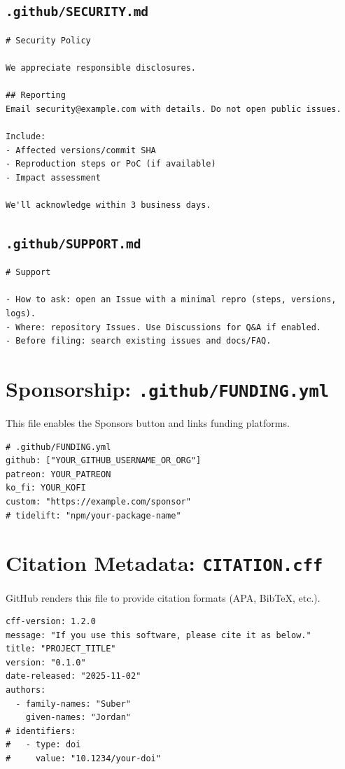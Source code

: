 \documentclass[11pt]{article}
\newcommand{\file}[1]{\texttt{#1}}
\begin{document}
\clearpage
\subsection{\file{.github/SECURITY.md}}
\begin{verbatim}
# Security Policy

We appreciate responsible disclosures.

## Reporting
Email security@example.com with details. Do not open public issues.

Include:
- Affected versions/commit SHA
- Reproduction steps or PoC (if available)
- Impact assessment

We'll acknowledge within 3 business days.
\end{verbatim}

\subsection{\file{.github/SUPPORT.md}}
\begin{verbatim}
# Support

- How to ask: open an Issue with a minimal repro (steps, versions, logs).
- Where: repository Issues. Use Discussions for Q&A if enabled.
- Before filing: search existing issues and docs/FAQ.
\end{verbatim}

\section{Sponsorship: \file{.github/FUNDING.yml}}
This file enables the Sponsors button and links funding platforms.
\begin{verbatim}
# .github/FUNDING.yml
github: ["YOUR_GITHUB_USERNAME_OR_ORG"]
patreon: YOUR_PATREON
ko_fi: YOUR_KOFI
custom: "https://example.com/sponsor"
# tidelift: "npm/your-package-name"
\end{verbatim}

\section{Citation Metadata: \file{CITATION.cff}}
GitHub renders this file to provide citation formats (APA, BibTeX, etc.).
\begin{verbatim}
cff-version: 1.2.0
message: "If you use this software, please cite it as below."
title: "PROJECT_TITLE"
version: "0.1.0"
date-released: "2025-11-02"
authors:
  - family-names: "Suber"
    given-names: "Jordan"
# identifiers:
#   - type: doi
#     value: "10.1234/your-doi"
\end{verbatim}
\end{document}

